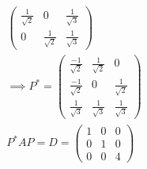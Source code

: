 \begin{enumerate}
\begin{gather}
\begin{pmatrix}
\frac{1}{\sqrt{2}} & 0 & \frac{1}{\sqrt{3}}\\
0 & \frac{1}{\sqrt{2}} & \frac{1}{\sqrt{3}}
\end{pmatrix}\\
\implies P^* = \begin{pmatrix}
\frac{-1}{\sqrt{2}} & \frac{1}{\sqrt{2}} & 0\\
\frac{-1}{\sqrt{2}} & 0 & \frac{1}{\sqrt{2}}\\
\frac{1}{\sqrt{3}} & \frac{1}{\sqrt{3}} & \frac{1}{\sqrt{3}}
\end{pmatrix}\\
P^*AP = D = \begin{pmatrix}
1 & 0 & 0 \\
0 & 1 & 0\\
0 & 0 & 4
\end{pmatrix}
\end{gather}
\end{enumerate}
